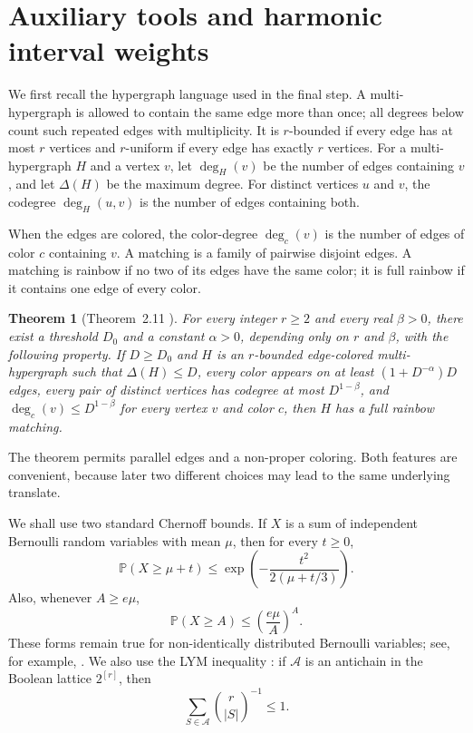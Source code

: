 \documentclass[10pt,a4paper]{amsart}
\numberwithin{equation}{section}
\newtheorem{theorem}{Theorem}[section]
\newcommand{\Prob}{\mathbb{P}}
\begin{document}
\section{Auxiliary tools and harmonic interval weights}

We first recall the hypergraph language used in the final step.  A
multi-hypergraph is allowed to contain the same edge more than once; all
degrees below count such repeated edges with multiplicity.  It is
$r$-bounded if every edge has at most $r$ vertices and $r$-uniform if every
edge has exactly $r$ vertices.  For a multi-hypergraph $H$ and a vertex $v$,
let $\deg_H(v)$ be the number of edges containing $v$, and let $\Delta(H)$ be
the maximum degree.  For distinct vertices $u$ and $v$, the codegree
$\deg_H(u,v)$ is the number of edges containing both.

When the edges are colored, the color-degree $\deg_c(v)$ is the number of
edges of color $c$ containing $v$.  A matching is a family of pairwise disjoint
edges.  A matching is rainbow if no two of its edges have the same color; it is
full rainbow if it contains one edge of every color.


\begin{theorem}[Theorem~2.11 \cite{DP}]\label{thm:DP}
For every integer $r\ge2$ and every real $\beta>0$, there exist a threshold
$D_0$ and a constant $\alpha>0$, depending only on $r$ and $\beta$, with the
following property.  If $D\ge D_0$ and $H$ is an $r$-bounded edge-colored
multi-hypergraph such that $\Delta(H)\le D$, every color appears on at least
$(1+D^{-\alpha})D$ edges, every pair of distinct vertices has codegree at most
$D^{1-\beta}$, and $\deg_c(v)\le D^{1-\beta}$ for every vertex $v$ and color
$c$, then $H$ has a full rainbow matching.
\end{theorem}


The theorem permits parallel edges and a non-proper coloring.  Both features
are convenient, because later two different choices may lead to the same
underlying translate.

We shall use two standard Chernoff bounds.  If $X$ is a sum of independent
Bernoulli random variables with mean $\mu$, then for every $t\ge0$,
\begin{equation}\label{eq:chernoff-additive}
        \Prob(X\ge\mu+t)
        \le \exp\!\left(-\frac{t^2}{2(\mu+t/3)}\right).
\end{equation}
Also, whenever $A\ge e\mu$,
\begin{equation}\label{eq:chernoff-large}
        \Prob(X\ge A)\le\left(\frac{e\mu}{A}\right)^A .
\end{equation}
These forms remain true for non-identically distributed Bernoulli variables;
see, for example, \cite{AlonSpencer}.  We also use the LYM inequality
\cite{Lubell}: if $\mathcal A$ is an antichain in the Boolean lattice
$2^{[r]}$, then
\begin{equation}\label{eq:LYM}
        \sum_{S\in\mathcal A}\binom{r}{|S|}^{-1}\le1.
\end{equation}
\end{document}
